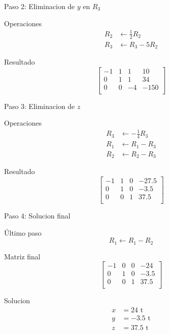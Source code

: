 \documentclass{beamer}
\begin{document}
\begin{frame}{Paso 2: Eliminacion de $y$ en $R_3$}
\begin{block}{Operaciones}
\begin{align*}
R_2 &\leftarrow \tfrac{1}{2} R_2 \\
R_3 &\leftarrow R_3 - 5R_2
\end{align*}
\end{block}

\begin{exampleblock}{Resultado}
\scriptsize
\[
\left[
\begin{array}{rrr|r}
-1 & 1 & 1 & 10 \\
0 & 1 & 1 & 34 \\
0 & 0 & -4 & -150 \\
\end{array}
\right]
\]
\end{exampleblock}
\end{frame}

\begin{frame}{Paso 3: Eliminacion de $z$}
\begin{block}{Operaciones}
\begin{align*}
R_3 &\leftarrow -\tfrac{1}{4}R_3 \\
R_1 &\leftarrow R_1 - R_3 \\
R_2 &\leftarrow R_2 - R_3
\end{align*}
\end{block}

\begin{exampleblock}{Resultado}
\scriptsize
\[
\left[
\begin{array}{rrr|r}
-1 & 1 & 0 & -27.5 \\
0 & 1 & 0 & -3.5 \\
0 & 0 & 1 & 37.5 \\
\end{array}
\right]
\]
\end{exampleblock}
\end{frame}

\begin{frame}{Paso 4: Solucion final}
\begin{block}{Último paso}
\[ R_1 \leftarrow R_1 - R_2 \]
\end{block}

\begin{alertblock}{Matriz final}
\scriptsize
\[
\left[
\begin{array}{rrr|r}
-1 & 0 & 0 & -24 \\
0 & 1 & 0 & -3.5 \\
0 & 0 & 1 & 37.5 \\
\end{array}
\right]
\]
\end{alertblock}

\begin{block}{Solucion}
\begin{align*}
x &= 24 \text{ t} \\
y &= -3.5 \text{ t} \\
z &= 37.5 \text{ t}
\end{align*}
\end{block}
\end{frame}
\end{document}
